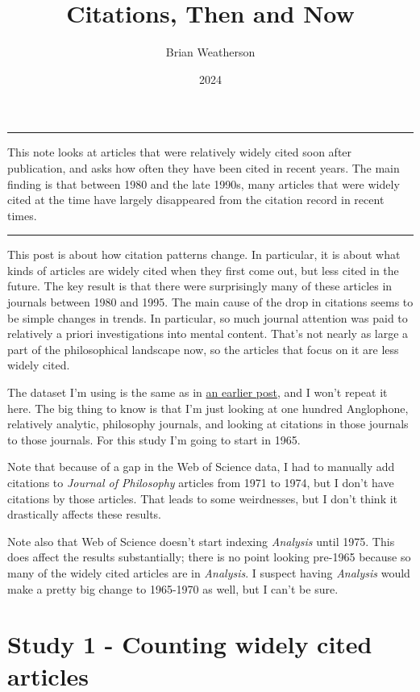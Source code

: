 \documentclass[
  10pt,
  letterpaper,
  DIV=11,
  numbers=noendperiod,
  twoside]{scrartcl}
\title{Citations, Then and Now}
\author{Brian Weatherson}
\date{2024}
\renewenvironment{abstract}
 {\vspace{-1.25cm}
 \quotation\small\noindent\rule{\linewidth}{.5pt}\par\smallskip
 \noindent }
 {\par\noindent\rule{\linewidth}{.5pt}\endquotation}
\begin{document}
\maketitle
\begin{abstract}
This note looks at articles that were relatively widely cited soon after
publication, and asks how often they have been cited in recent years.
The main finding is that between 1980 and the late 1990s, many articles
that were widely cited at the time have largely disappeared from the
citation record in recent times.
\end{abstract}

This post is about how citation patterns change. In particular, it is
about what kinds of articles are widely cited when they first come out,
but less cited in the future. The key result is that there were
surprisingly many of these articles in journals between 1980 and 1995.
The main cause of the drop in citations seems to be simple changes in
trends. In particular, so much journal attention was paid to relatively
a priori investigations into mental content. That's not nearly as large
a part of the philosophical landscape now, so the articles that focus on
it are less widely cited.

The dataset I'm using is the same as in
\href{http://brian.weatherson.org/quarto/posts/citations-raw-data/citations.html}{an
earlier post}, and I won't repeat it here. The big thing to know is that
I'm just looking at one hundred Anglophone, relatively analytic,
philosophy journals, and looking at citations in those journals to those
journals. For this study I'm going to start in 1965.

Note that because of a gap in the Web of Science data, I had to manually
add citations to \emph{Journal of Philosophy} articles from 1971 to
1974, but I don't have citations by those articles. That leads to some
weirdnesses, but I don't think it drastically affects these results.

Note also that Web of Science doesn't start indexing \emph{Analysis}
until 1975. This does affect the results substantially; there is no
point looking pre-1965 because so many of the widely cited articles are
in \emph{Analysis}. I suspect having \emph{Analysis} would make a pretty
big change to 1965-1970 as well, but I can't be sure.

\section{Study 1 - Counting widely cited articles}\label{sec-study-one}
\end{document}
